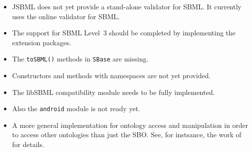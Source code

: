 \begin{itemize}
\item JSBML does not yet provide a stand-alone validator for SBML. It currently
uses the online validator for SBML.
\item The support for SBML Level~3 should be completed by
implementing the extension packages.
\item The \texttt{toSBML()}
methods in \texttt{SBase} are missing.
\item Constructors and methods with namespaces are not yet provided.
\item The libSBML compatibility module
needs to be fully implemented.
\item Also the \texttt{android} module is not ready yet.
\item A more general implementation for ontology access and manipulation in
order to access other ontologies than just the SBO. See, for instsance, the work
of \citet{Courtot2011a} for details.
\end{itemize}
